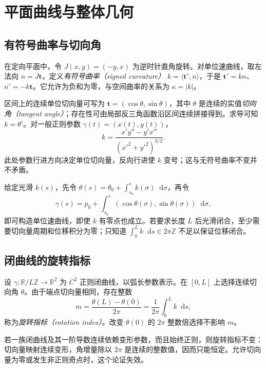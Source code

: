 \documentclass[UTF8,12pt,a4paper,fontset=fandol]{ctexbook}
\newcommand{\R}{\mathbb R}
\newcommand{\dd}{\mathop{}\!\mathrm d}
\newcommand{\ip}[2]{\langle #1,#2\rangle}
\begin{document}
\chapter{平面曲线与整体几何}
\label{chap:dg-plane}

\section{有符号曲率与切向角}
在定向平面中，令 $J(x,y)=(-y,x)$ 为逆时针直角旋转。对单位速曲线，取左法向 $n=J\mathbf t$，定义\emph{有符号曲率（signed curvature）} $k=\ip{\mathbf t'}n$，于是 $\mathbf t'=kn$、$n'=-k\mathbf t$。它允许为负和为零，与空间曲率的关系为 $\kappa=|k|$。

区间上的连续单位切向量可写为 $\mathbf t=(\cos\theta,\sin\theta)$，其中 $\theta$ 是连续的实值\emph{切向角（tangent angle）}；存在性可由局部反三角函数沿区间连续拼接得到。求导可知 $k=\theta'$。对一般正则参数 $\gamma(t)=(x(t),y(t))$，
\begin{equation}
 k=\frac{x'y''-y'x''}{(x'^2+y'^2)^{3/2}}.
 \label{eq:dg-signed-curvature}
\end{equation}
此处参数行进方向决定单位切向量，反向行进使 $k$ 变号；这与无符号曲率不变并不矛盾。

给定光滑 $k(s)$，先令 $\theta(s)=\theta_0+\int_{s_0}^s k(\sigma)\dd\sigma$，再令
\[
 \gamma(s)=p_0+\int_{s_0}^s(\cos\theta(\sigma),\sin\theta(\sigma))\dd\sigma,
\]
即可构造单位速曲线，即使 $k$ 有零点也成立。若要求长度 $L$ 后光滑闭合，至少需要切向量周期和位移积分为零；只知道 $\int_0^L k\dd s\in2\pi\mathbb Z$ 不足以保证位移闭合。

\section{闭曲线的旋转指标}
\begin{definition}[旋转指标]
设 $\gamma:\R/L\mathbb Z\to\R^2$ 为 $C^2$ 正则闭曲线，以弧长参数表示。在 $[0,L]$ 上选择连续切向角 $\theta$。由于端点切向量相同，存在整数
\[
 m=\frac{\theta(L)-\theta(0)}{2\pi}
   =\frac1{2\pi}\int_0^L k\dd s,
\]
称为\emph{旋转指标（rotation index）}。改变 $\theta(0)$ 的 $2\pi$ 整数倍选择不影响 $m$。
\end{definition}
若一族闭曲线及其一阶导数连续依赖变形参数，而且始终正则，则旋转指标不变：切向量映射连续变形，角增量除以 $2\pi$ 是连续的整数值，因而只能恒定。允许切向量为零或发生非正则奇点时，这个论证失效。
\end{document}
